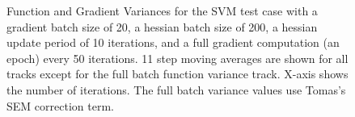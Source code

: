 \documentclass{article}
\begin{document}
\begin{figure}[h!]
\centering
{}
\caption{Function and Gradient Variances for the SVM test case with a gradient batch size of 20, a hessian batch size of 200, a hessian update period of 10 iterations, and a full gradient computation (an epoch) every 50 iterations. 11 step moving averages are shown for all tracks except for the full batch function variance track. X-axis shows the number of iterations. The full batch variance values use Tomas's SEM correction term.}
\end{figure}
\end{document}
